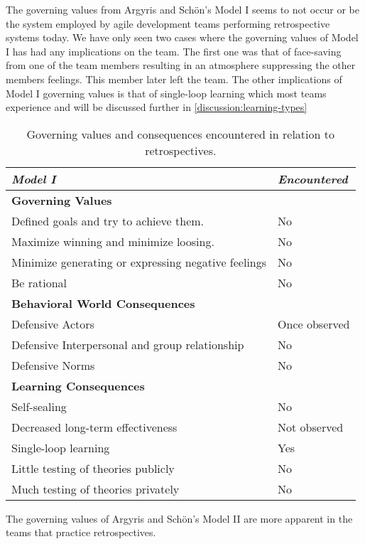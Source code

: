 The governing values from Argyris and Schön's Model I seems to not occur or be the system employed by agile development teams performing retrospective systems today. We have only seen two cases where the governing values of Model I has had any implications on the team. The first one was that of face-saving from one of the team members resulting in an atmosphere suppressing the other members feelings. This member later left the team. The other implications of Model I governing values is that of single-loop learning which most teams experience and will be discussed further in \autoref{discussion:learning-types}

\begin{table}[h]
	\begin{center}
		\caption{Governing values and consequences encountered in relation to retrospectives.}
		\label{table:model-i-occurences}
		\begin{tabular}{l l}
			\hline
			\textit{Model I} & \textit{Encountered} \\
			\hline
			\textbf{Governing Values} & \\
			Defined goals and try to achieve them. & No \\
			Maximize winning and minimize loosing. & No \\
			Minimize generating or expressing negative feelings & No \\
			Be rational & No \\
			\hline
			\textbf{Behavioral World Consequences} & \\
			Defensive Actors & Once observed \\
			Defensive Interpersonal and group relationship & No \\
			Defensive Norms & No \\
			\hline
			\textbf{Learning Consequences} & \\
			Self-sealing & No \\
			Decreased long-term effectiveness & Not observed \\
			Single-loop learning & Yes \\
			Little testing of theories publicly & No \\
			Much testing of theories privately & No \\
			\hline
		\end{tabular}
	\end{center}
\end{table}

The governing values of Argyris and Schön's Model II are more apparent in the teams that practice retrospectives. 

